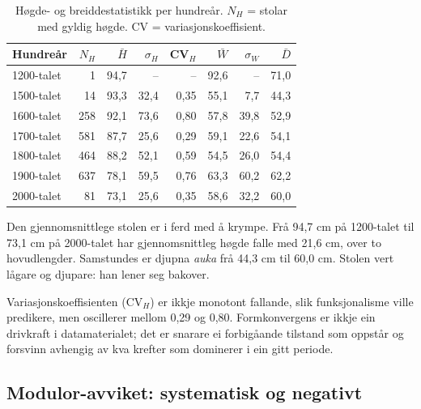 \documentclass[10pt, a4paper, twocolumn]{article}
\begin{document}
\begin{table}[H]
\centering
\caption{Høgde- og breiddestatistikk per hundreår. $N_H$ = stolar med gyldig høgde. CV = variasjonskoeffisient.}
\label{tab:dimensions}
\begin{tabular}{@{}lrrrrrrr@{}}
\toprule
\textbf{Hundreår} & \textbf{$N_H$} & \textbf{$\bar{H}$} & \textbf{$\sigma_H$} & \textbf{CV$_H$} & \textbf{$\bar{W}$} & \textbf{$\sigma_W$} & \textbf{$\bar{D}$} \\
\midrule
1200-talet &   1 &  94,7 &     -- &    -- & 92,6 &     -- & 71,0 \\
1500-talet &  14 &  93,3 &  32,4 & 0,35 & 55,1 &   7,7 & 44,3 \\
1600-talet & 258 &  92,1 &  73,6 & 0,80 & 57,8 &  39,8 & 52,9 \\
1700-talet & 581 &  87,7 &  25,6 & 0,29 & 59,1 &  22,6 & 54,1 \\
1800-talet & 464 &  88,2 &  52,1 & 0,59 & 54,5 &  26,0 & 54,4 \\
1900-talet & 637 &  78,1 &  59,5 & 0,76 & 63,3 &  60,2 & 62,2 \\
2000-talet &  81 &  73,1 &  25,6 & 0,35 & 58,6 &  32,2 & 60,0 \\
\bottomrule
\end{tabular}
\end{table}

Den gjennomsnittlege stolen er i ferd med å krympe. Frå 94,7 cm på 1200-talet til 73,1 cm på 2000-talet har gjennomsnittleg høgde falle med 21,6 cm, over to hovudlengder. Samstundes er djupna \emph{auka} frå 44,3 cm til 60,0 cm. Stolen vert lågare og djupare: han lener seg bakover.

Variasjonskoeffisienten ($\text{CV}_H$) er ikkje monotont fallande, slik funksjonalisme ville predikere, men oscillerer mellom 0,29 og 0,80. Formkonvergens er ikkje ein drivkraft i datamaterialet; det er snarare ei forbigåande tilstand som oppstår og forsvinn avhengig av kva krefter som dominerer i ein gitt periode.


\subsection{Modulor-avviket: systematisk og negativt}
\end{document}
